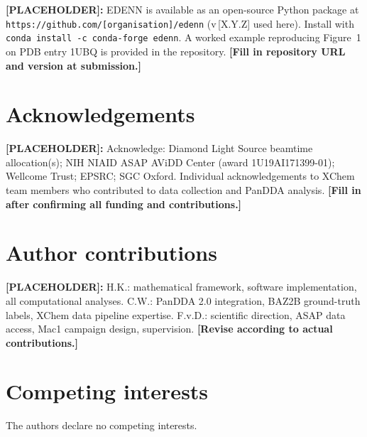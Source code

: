 \documentclass[10pt,twocolumn]{article}
\newcommand{\placeholder}[1]{%
  \begin{mdframed}[
    linecolor=placeholder,linewidth=1pt,
    backgroundcolor=red!5,
    innertopmargin=6pt,innerbottommargin=6pt,
    innerleftmargin=8pt,innerrightmargin=8pt]
  \small\color{placeholder}\textbf{[PLACEHOLDER]:} #1
  \end{mdframed}
}
\begin{document}
\placeholder{
EDENN is available as an open-source Python package at
\texttt{https://github.com/[organisation]/edenn} (v\,[X.Y.Z] used here).
Install with \texttt{conda install -c conda-forge edenn}.
A worked example reproducing Figure~1 on PDB entry 1UBQ is
provided in the repository.
\textbf{[Fill in repository URL and version at submission.]}
}

\section*{Acknowledgements}

\placeholder{
Acknowledge: Diamond Light Source beamtime allocation(s);
NIH NIAID ASAP AViDD Center (award 1U19AI171399-01);
Wellcome Trust; EPSRC; SGC Oxford.
Individual acknowledgements to XChem team members who contributed
to data collection and PanDDA analysis.
\textbf{[Fill in after confirming all funding and contributions.]}
}

\section*{Author contributions}

\placeholder{
H.K.: mathematical framework, software implementation,
all computational analyses.
C.W.: PanDDA 2.0 integration, BAZ2B ground-truth labels,
XChem data pipeline expertise.
F.v.D.: scientific direction, ASAP data access, Mac1 campaign
design, supervision.
\textbf{[Revise according to actual contributions.]}
}

\section*{Competing interests}

The authors declare no competing interests.


\end{document}

